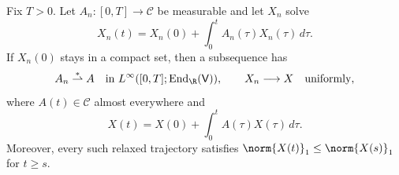 \documentclass[class=article,11pt,a4paper,crop=false]{standalone}
\begin{document}
\begin{lemma}
\label{lem:q2-relaxed-compactness}
Fix $T>0$. Let $A_n:[0,T]\to\mathcal C$ be measurable and let
$X_n$ solve
\begin{equation}
 X_n(t)=X_n(0)+\int_0^t A_n(\tau)X_n(\tau)\,d\tau.
 \label{eq:q2-integral-equation-n}
\end{equation}
If $X_n(0)$ stays in a compact set, then a subsequence has
\begin{equation}
 A_n\stackrel{*}{\rightharpoonup}A
 \quad\text{in }L^\infty([0,T];\operatorname{End}_{\R}(\mathsf V)),
 \qquad
 X_n\longrightarrow X\quad\text{uniformly},
 \label{eq:q2-compact-convergence}
\end{equation}
where $A(t)\in\mathcal C$ almost everywhere and
\begin{equation}
 X(t)=X(0)+\int_0^t A(\tau)X(\tau)\,d\tau.
 \label{eq:q2-limit-integral-equation}
\end{equation}
Moreover, every such relaxed trajectory satisfies
$\norm{X(t)}_1\le\norm{X(s)}_1$ for $t\ge s$.
\end{lemma}
\end{document}
